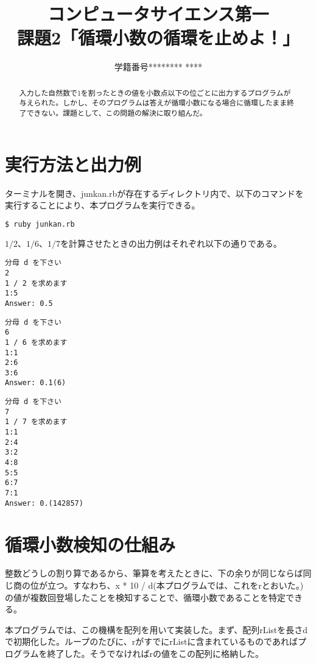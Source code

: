\documentclass{jsarticle}
\title{コンピュータサイエンス第一\\課題2「循環小数の循環を止めよ！」}
\author{学籍番号******** ****}
\date{}
\begin{document}
\maketitle

\begin{abstract}

入力した自然数で1を割ったときの値を小数点以下の位ごとに出力するプログラムが与えられた。しかし、そのプログラムは答えが循環小数になる場合に循環したまま終了できない。課題として、この問題の解決に取り組んだ。

\end{abstract}

\section{実行方法と出力例}

ターミナルを開き、junkan.rbが存在するディレクトリ内で、以下のコマンドを実行することにより、本プログラムを実行できる。

\begin{lstlisting}[language=sh]
$ ruby junkan.rb
\end{lstlisting}

$1/2$、$1/6$、$1/7$を計算させたときの出力例はそれぞれ以下の通りである。

\begin{lstlisting}
分母 d を下さい
2
1 / 2 を求めます
1:5
Answer: 0.5
\end{lstlisting}

\begin{lstlisting}
分母 d を下さい    
6              
1 / 6 を求めます   
1:1           
2:6           
3:6           
Answer: 0.1(6)
\end{lstlisting}

\begin{lstlisting}
分母 d を下さい
7
1 / 7 を求めます
1:1
2:4
3:2
4:8
5:5
6:7
7:1
Answer: 0.(142857)
\end{lstlisting}

\section{循環小数検知の仕組み}

整数どうしの割り算であるから、筆算を考えたときに、下の余りが同じならば同じ商の位が立つ。すなわち、x * 10 / d(本プログラムでは、これをrとおいた。)の値が複数回登場したことを検知することで、循環小数であることを特定できる。

本プログラムでは、この機構を配列を用いて実装した。まず、配列rListを長さdで初期化した。ループのたびに、rがすでにrListに含まれているものであればプログラムを終了した。そうでなければrの値をこの配列に格納した。
\end{document}
